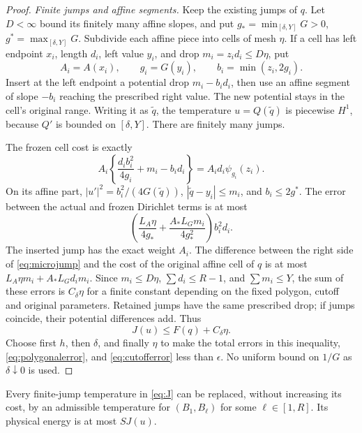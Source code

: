 \begin{proof}
\emph{Finite jumps and affine segments.}
Keep the existing jumps of \(q\). Let \(D<\infty\) bound its finitely
many affine slopes, and put
\(g_*=\min_{[\delta,Y]}G>0\), \(g^*=\max_{[\delta,Y]}G\).
Subdivide each affine piece into cells of mesh \(\eta\).
If a cell has left endpoint \(x_i\), length \(d_i\), left value \(y_i\), and drop
\(m_i=z_i d_i\le D\eta\), put
\[
 A_i=A(x_i),\qquad g_i=G(y_i),\qquad b_i=\min(z_i,2g_i).
\]
Insert at the left endpoint a potential drop \(m_i-b_id_i\), then
use an affine segment of slope \(-b_i\) reaching the prescribed
right value. The new potential stays in the cell's original range.
Writing it as \(\widetilde q\), the temperature \(u=Q(\widetilde q)\)
is piecewise \(H^1\), because \(Q'\) is bounded on \([\delta,Y]\).
There are finitely many jumps.

The frozen cell cost is exactly
\begin{equation}\label{eq:microjump}
 A_i\left\{\frac{d_ib_i^2}{4g_i}+m_i-b_id_i\right\}
                   =A_id_i\psi_{g_i}(z_i).
\end{equation}
On its affine part,
\(|u'|^2=b_i^2/(4G(\widetilde q))\),
\(|\widetilde q-y_i|\le m_i\), and \(b_i\le2g^*\).
The error between the actual and frozen Dirichlet terms is at most
\[
 \left(\frac{L_A\eta}{4g_*}
              +\frac{A_*L_Gm_i}{4g_*^2}\right)b_i^2d_i .
\]
The inserted jump has the exact weight \(A_i\).
The difference between the right side of \eqref{eq:microjump}
and the cost of the original affine cell of \(q\) is at most
\(L_A\eta m_i+A_*L_Gd_im_i\).
Since \(m_i\le D\eta\), \(\sum d_i\le R-1\), and
\(\sum m_i\le Y\), the sum of these errors is \(C_\delta\eta\)
for a finite constant depending on the fixed polygon, cutoff and
original parameters. Retained jumps have the same prescribed drop;
if jumps coincide, their potential differences add.
Thus
\[
 J(u)\le F(q)+C_\delta\eta .
\]
Choose first \(h\), then \(\delta\), and finally \(\eta\) to make
the total errors in this inequality, \eqref{eq:polygonalerror}, and
\eqref{eq:cutofferror} less than \(\epsilon\). No uniform bound on
\(1/G\) as \(\delta\downarrow0\) is used.
\end{proof}

\begin{proposition}\label{prop:elimination}
Every finite-jump temperature in \eqref{eq:J} can be replaced, without
increasing its cost, by an admissible temperature for
\((B_1,B_\ell)\) for some \(\ell\in[1,R]\). Its physical energy is
at most \(S J(u)\).
\end{proposition}

